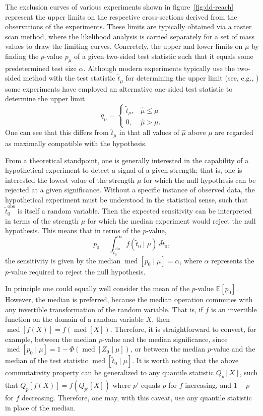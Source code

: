 \documentclass[b5paper, 10pt, twoside]{book}
\newcommand{\difd}{\,d}
\DeclareMathOperator{\med}{med}
\begin{document}
The exclusion curves of various experiments shown in figure~\ref{fig:dd-reach} represent the upper limits on the respective cross-sections derived from the observations of the experiments. These limits are typically obtained via a raster scan method, where the likelihood analysis is carried separately for a set of mass values to draw the limiting curves. Concretely, the upper and lower limits on $\mu$ by finding the $p$-value $p_\mu$ of a given two-sided test statistic such that it equals some predetermined test size $\alpha$. Although modern experiments typically use the two-sided method with the test statistic $\tilde{t}_\mu$ for determining the upper limit (see, e.g., \textcites{XENON2019b, PandaX2021, LZ2024}) some experiments have employed an alternative one-sided test statistic to determine the upper limit \parencite{CowanEtAl2011}
\begin{equation}
    \tilde{q}_\mu=
    \begin{cases}
        \tilde{t}_\mu,&\hat{\mu}\leq\mu\\
        0,&\hat{\mu}>\mu.
    \end{cases}
\end{equation}
One can see that this differs from $\tilde{t}_\mu$ in that all values of $\hat{\mu}$ above $\mu$ are regarded as maximally compatible with the hypothesis.

From a theoretical standpoint, one is generally interested in the capability of a hypothetical experiment to detect a signal of a given strength; that is, one is interested the lowest value of the strength $\mu$ for which the null hypothesis can be rejected at a given significance. Without a specific instance of observed data, the hypothetical experiment must be understood in the statistical sense, such that $\tilde{t}_0^\text{obs}$ is itself a random variable. Then the expected sensitivity can be interpreted in terms of the strength $\mu$ for which the median experiment would reject the null hypothesis. This means that in terms of the $p$-value,
\begin{equation}
    p_0=\int_{\tilde{t}_0^\text{obs}}^\infty f(\tilde{t}_0\mid\mu)\difd\tilde{t}_0,
\end{equation}
the sensitivity is given by the median $\med[p_0\mid\mu]=\alpha$, where $\alpha$ represents the $p$-value required to reject the null hypothesis.

In principle one could equally well consider the mean of the $p$-value $\mathbb{E}[p_0]$. However, the median is preferred, because the median operation commutes with any invertible transformation of the random variable. That is, if $f$ is an invertible function on the domain of a random variable $X$, then $\med[f(X)]=f(\med[X])$. Therefore, it is straightforward to convert, for example, between the median $p$-value and the median significance, since $\med[p_0\mid\mu]=1-\Phi(\med[Z_0\mid\mu])$, or between the median $p$-value and the median of the test statistic $\med[\tilde{t}_0\mid\mu]$. It is worth noting that the above commutativity property can be generalized to any quantile statistic $Q_p[X]$, such that $Q_p[f(X)]=f(Q_{p'}[X])$ where $p'$ equals $p$ for $f$ increasing, and $1-p$ for $f$ decreasing. Therefore, one may, with this caveat, use any quantile statistic in place of the median.
\end{document}
